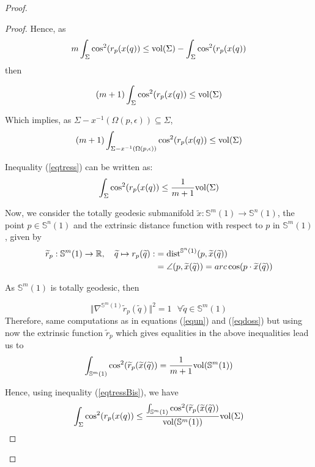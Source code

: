 \documentclass{amsart}
\theoremstyle{definition}
\theoremstyle{remark}
\newcommand{\ese}{\mathbb{S}}
\begin{document}
\begin{proof}
\begin{proof}
Hence, as 
$$m\int_\Sigma \cos^2(r_p(x(q))\leq {\rm vol}(\Sigma)- \int_\Sigma \cos^2(r_p(x(q))$$ \noindent then

\begin{equation}\label{eqtress}
(m+1)\int_\Sigma \cos^2(r_p(x(q))\leq {\rm vol}(\Sigma)
\end{equation}

Which implies, as  $\Sigma-x^{-1}(\Omega(p,\epsilon)) \subseteq \Sigma$,
\begin{equation}\label{eqcu}
(m+1)\int_{\Sigma-x^{-1}(\Omega(p,\epsilon))} \cos^2(r_p(x(q))\leq {\rm vol}(\Sigma)
\end{equation}


Inequality (\ref{eqtress}) can be written as:
\begin{equation}\label{eqtressBis}
\int_\Sigma \cos^2(r_p(x(q)) \leq \frac{1}{m+1} {\rm vol}(\Sigma)
\end{equation}

Now, we consider the totally geodesic submanifold $\widetilde{x}: \mathbb{S}^m(1) \rightarrow \mathbb{S}^n(1)$, the point $p \in \ese^n(1)$ and the extrinsic distance function with respect to $p$ in $\ese^m(1)$, given by
$$
\begin{aligned}
\widetilde{r}_p:\ese^m(1) \to \mathbb{R}, \quad \widetilde{q}\mapsto r_p(\widetilde{q}):&={\rm dist}^{\mathbb{S}^n(1)}(p,\widetilde{x}(\widetilde{q}))\\&=\angle{(p,\widetilde{x}(\widetilde{q}))}=arc\cos(p\cdot \widetilde{x}(\widetilde{q}))
\end{aligned}
$$


As $\ese^m(1)$ is totally geodesic, then

$$\Vert \nabla^{\ese^m(1)}\widetilde{r}_p(\widetilde{q})\Vert^2=1\,\,\,\,\forall \widetilde{q} \in \ese^m(1)$$
\noindent Therefore, same computations as in equations (\ref{equn}) and (\ref{eqdoss}) but using now the extrinsic function $\widetilde{r}_p$ which gives equalities in the above inequalities lead us to
\begin{equation}\label{eqcinc}
\int_{\mathbb{S}^m(1)} \cos^2(\widetilde{r}_p(\widetilde{x}(\widetilde{q})) = \frac{1}{m+1} {\rm vol}(\mathbb{S}^m(1))
\end{equation}

Hence, using inequality (\ref{eqtressBis}), we have 
\begin{equation}\label{eqsis}
\int_\Sigma \cos^2(r_p(x(q)) \leq \frac{\int_{\mathbb{S}^m(1)} \cos^2(\widetilde{r}_p(\widetilde{x}(\widetilde{q}))}{{\rm vol}(\mathbb{S}^m(1))} {\rm vol}(\Sigma)
\end{equation}


\end{proof}
\end{proof}
\end{document}
